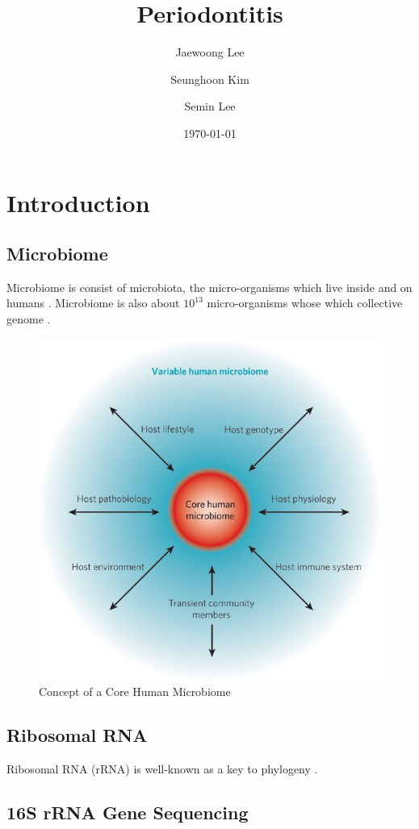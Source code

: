 \documentclass[a4paper]{article}
\title{Periodontitis}
\author{
    Jaewoong Lee
    \and
    Seunghoon Kim
    \and
    Semin Lee
}
\date{\today}
\begin{document}
   	\maketitle
    \newpage

    \tableofcontents
    \listoftables
    \listoffigures
    \newpage

    \section{Introduction}
        \subsection{Microbiome}
            Microbiome is consist of microbiota, the micro-organisms which live inside and on humans \cite{microbiome1}. Microbiome is also about $10^{13}$ micro-organisms whose which collective genome \cite{microbiome2}.

            \begin{figure}[p]
                \centering
                \includegraphics[width=0.5 \linewidth]{figures/microbiome.jpg}
                \caption{Concept of a Core Human Microbiome \protect\cite{microbiome1}}
                \label{fig:microbiome-concept}
            \end{figure}

        \subsection{Ribosomal RNA}
            Ribosomal RNA (rRNA) is well-known as a key to phylogeny \cite{rRNA1}.

        \subsection{16S rRNA Gene Sequencing}
\end{document}
